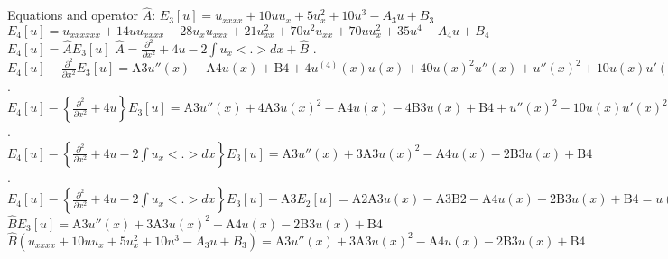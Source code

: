 \documentclass[12pt,a4paper]{article}
\begin{document}
Equations and operator $\widehat{A}$:
\newline
$
E_3[u] = u_{xxxx} + 10u u_x + 5 u_{x}^{2} + 10u^3 - A_{3} u + B_{3}
$
\newline
$E_4[u] = u_{xxxxxx} + 14uu_{xxxx} + 28u_{x}u_{xxx} + 21u_{xx}^{2} + 70 u^2 u_{xx} + 70 u u_{x}^{2} + 35 u^4 - A_{4} u + B_{4}$
\newline
$ E_4[u] = \widehat{A} E_3[u]$
\newline
\newline
$\widehat{A} = \frac{\partial^2}{\partial x^2} + 4u - 2 \int u_{x} <.> dx + \widehat{B}$
\newline
{}. $E_4[u] - \frac{\partial^2}{\partial x^2} E_3[u] = 
   \text{A3} u''(x)-\text{A4} u(x)+\text{B4}+4 u^{(4)}(x) u(x)+40
    u(x)^2 u''(x)+u''(x)^2+10 u(x) u'(x)^2-2 u^{(3)}(x) u'(x)+35
    u(x)^4$
\newline
{}. $E_4[u] - \left\lbrace \frac{\partial^2}{\partial x^2} + 4u \right\rbrace E_3[u] = \text{A3} u''(x)+4 \text{A3} u(x)^2-\text{A4} u(x)-4 \text{B3}
    u(x)+\text{B4}+u''(x)^2-10 u(x) u'(x)^2-2 u^{(3)}(x) u'(x)-5
    u(x)^4$
\newline
{}. $E_4[u] - \left\lbrace \frac{\partial^2}{\partial x^2} + 4u - 2 \int u_{x} <.> dx \right\rbrace E_3[u] =  \text{A3} u''(x)+3 \text{A3} u(x)^2-\text{A4} u(x)-2 \text{B3}u(x)+\text{B4}$
\newline
{}. $E_4[u] - \left\lbrace \frac{\partial^2}{\partial x^2} + 4u - 2 \int u_{x} <.> dx \right\rbrace E_3[u] - \text{A3} E_2[u] = \text{A2} \text{A3} u(x)-\text{A3} \text{B2}-\text{A4} u(x)-2
    \text{B3} u(x)+\text{B4} = u(x) (\text{A2} \text{A3}-\text{A4}-2 \text{B3})-\text{A3}
    \text{B2}+\text{B4}$
\newline
\newline
\newline
$\widehat{B}E_3 [u] = \text{A3} u''(x)+3 \text{A3} u(x)^2-\text{A4} u(x)-2 \text{B3}u(x)+\text{B4}$
\newline
$\widehat{B} (u_{xxxx} + 10u u_x + 5 u_{x}^{2} + 10u^3 - A_{3} u + B_{3}) = \text{A3} u''(x)+3 \text{A3} u(x)^2-\text{A4} u(x)-2 \text{B3}u(x)+\text{B4}$
\end{document}
